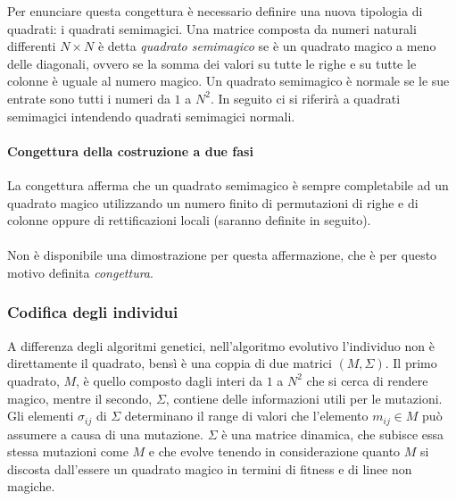 \documentclass[italian,twoside,twocolumn]{article}
\begin{document}
Per enunciare questa congettura è necessario definire una nuova tipologia di quadrati: i quadrati semimagici. Una matrice composta da numeri naturali differenti $ N\times N $ è detta \emph{quadrato semimagico} se è un quadrato magico a meno delle diagonali, ovvero se la somma dei valori su tutte le righe e su tutte le colonne è uguale al numero magico. Un quadrato semimagico è normale se le sue entrate sono tutti i numeri da $ 1 $ a $ N^2 $. In seguito ci si riferirà a quadrati semimagici intendendo quadrati semimagici normali. 

\paragraph{Congettura della costruzione a due fasi} La congettura afferma che un quadrato semimagico è sempre completabile ad un quadrato magico utilizzando un numero finito di permutazioni di righe e di colonne oppure di rettificazioni locali (saranno definite in seguito). 
\\ \\
Non è disponibile una dimostrazione per questa affermazione, che è per questo motivo definita \emph{congettura}.

\subsubsection{Codifica degli individui}
A differenza degli algoritmi genetici, nell'algoritmo evolutivo l'individuo non è direttamente il quadrato, bensì è una coppia di due matrici $ \left(M, \Sigma \right) $. Il primo quadrato, $ M $, è quello composto dagli interi da $ 1 $ a $ N^2 $ che si cerca di rendere magico, mentre il secondo, $ \Sigma $, contiene delle informazioni utili per le mutazioni. Gli elementi $ \sigma_{ij} $ di $ \Sigma $ determinano il range di valori che l'elemento $ m_{ij} \in M $ può assumere a causa di una mutazione. $ \Sigma $ è una matrice dinamica, che subisce essa stessa mutazioni come $ M $ e che evolve tenendo in considerazione quanto $ M $ si discosta dall'essere un quadrato magico in termini di fitness e di linee non magiche.
\end{document}
